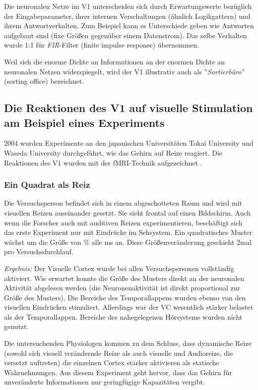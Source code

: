 \documentclass[12pt,a4paper]{article}
\newcommand{\fwex}[1]{\textit{#1}}
\begin{document}
Die neuronalen Netze im V1 unterscheiden sich durch Erwartungswerte bezüglich
der Eingabeparameter, ihrer internen Verschaltungen (ähnlich Logikgattern)
und ihrem Antwortverhalten. Zum Beispiel kann es Unterschiede geben wie
Antworten aufgebaut sind (fixe Größen gegenüber einem Datenstrom). Das selbe
Verhalten wurde 1:1 für \fwex{FIR}-Filter (finite impulse response)
übernommen.

Weil sich die enorme Dichte an Informationen an der enormen Dichte an
neuronalen Netzen widerspiegelt, wird der V1 illustrativ auch als
''\fwex{Sortierbüro}'' (sorting office) bezeichnet.

\subsection{Die Reaktionen des V1 auf visuelle Stimulation am Beispiel
    eines Experiments}

2004 wurden Experimente an den japanischen Universitäten Tokai University
und Waseda University durchgeführt, wie das Gehirn auf Reize reagiert.
Die Reaktionen des V1 wurden mit der fMRI-Technik
aufgezeichnet \cite{brainactivation}.

\subsubsection{Ein Quadrat als Reiz}

Die Versuchsperson befindet sich in einem abgeschotteten Raum und wird
mit visuellen Reizen auseinander gesetzt. Sie sieht frontal auf einen
Bildschirm. Auch wenn die Forscher auch mit auditiven Reizen experimentieren,
beschäftigt sich das erste Experiment nur mit Eindrücke im Sehsystem.
Ein quadratisches Muster wächst um die Größe von \unit[110]{\%} alle
\unit[750]{ms} an. Diese Größenveränderung geschieht 2mal pro
Versuchsdurchlauf.

\emph{Ergebnis:} Der Visuelle Cortex wurde bei allen Versuchspersonen
vollständig aktiviert. Wie erwartet konnte die Größe des Musters direkt an
der neuronalen Aktivität abgelesen werden (die Neuronenaktivität ist direkt
proportional zur Größe des Musters). Die Bereiche des Temporallappens wurden
ebenso von den visuellen Eindrücken stimuliert. Allerdings war der VC
wesentlich stärker belastet als der Temporallappen. Bereiche des
nahegelegenen Hörsystems wurden nicht genutzt.

Die untersuchenden Physiologen kommen zu dem Schluss, dass dynamische Reize
(sowohl sich visuell verändernde Reize als auch visuelle und Audioreize, die
versetzt auftreten) die einzelnen Cortex stärker aktivieren als statische
Wahrnehmungen. Aus diesem Experiment geht hervor, dass das Gehirn für
unveränderte Informationen nur geringfügige Kapazitäten vergibt.
\end{document}
